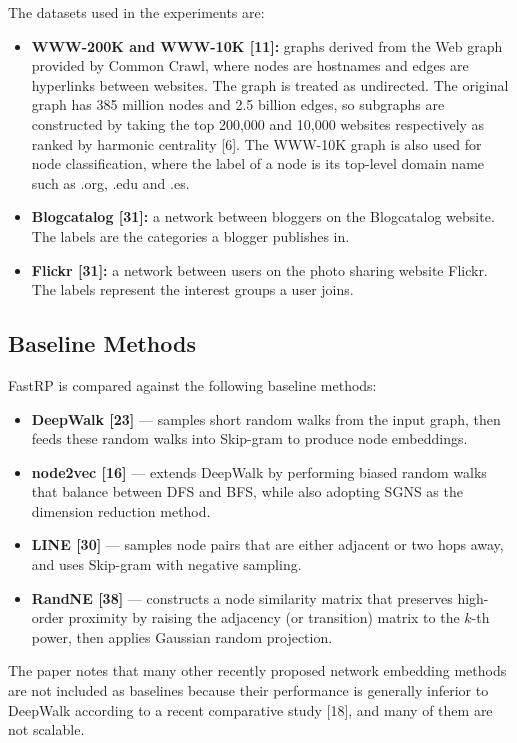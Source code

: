 \documentclass[11pt]{article}
\begin{document}
The datasets used in the experiments are:
\begin{itemize}[leftmargin=1.5em]
    \item \textbf{WWW-200K and WWW-10K [11]:} graphs derived from the Web graph provided by Common Crawl, where nodes are hostnames and edges are hyperlinks between websites. The graph is treated as undirected. The original graph has 385 million nodes and 2.5 billion edges, so subgraphs are constructed by taking the top 200,000 and 10,000 websites respectively as ranked by harmonic centrality [6]. The WWW-10K graph is also used for node classification, where the label of a node is its top-level domain name such as .org, .edu and .es.
    \item \textbf{Blogcatalog [31]:} a network between bloggers on the Blogcatalog website. The labels are the categories a blogger publishes in.
    \item \textbf{Flickr [31]:} a network between users on the photo sharing website Flickr. The labels represent the interest groups a user joins.
\end{itemize}

\subsection{Baseline Methods}

FastRP is compared against the following baseline methods:
\begin{itemize}[leftmargin=1.5em]
    \item \textbf{DeepWalk [23]} --- samples short random walks from the input graph, then feeds these random walks into Skip-gram to produce node embeddings.
    \item \textbf{node2vec [16]} --- extends DeepWalk by performing biased random walks that balance between DFS and BFS, while also adopting SGNS as the dimension reduction method.
    \item \textbf{LINE [30]} --- samples node pairs that are either adjacent or two hops away, and uses Skip-gram with negative sampling.
    \item \textbf{RandNE [38]} --- constructs a node similarity matrix that preserves high-order proximity by raising the adjacency (or transition) matrix to the $k$-th power, then applies Gaussian random projection.
\end{itemize}

The paper notes that many other recently proposed network embedding methods are not included as baselines because their performance is generally inferior to DeepWalk according to a recent comparative study [18], and many of them are not scalable.
\end{document}

